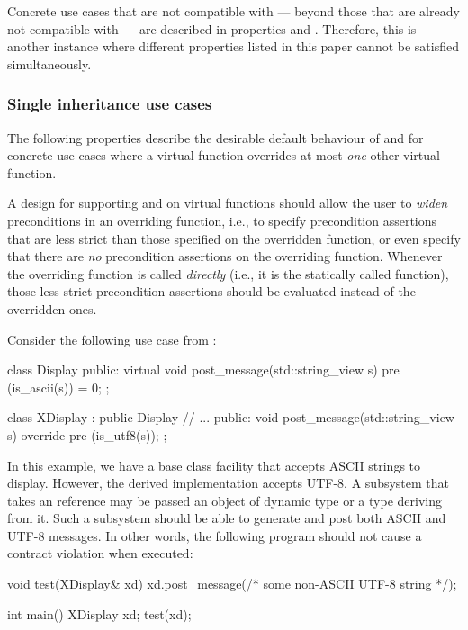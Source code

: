 Concrete use cases that are not compatible with  --- beyond those that are already not compatible with  --- are described in properties  and . Therefore, this is another instance where different properties listed in this paper cannot be satisfied simultaneously.

\subsubsection{Single inheritance use cases}

The following properties describe the desirable default behaviour of  and  for concrete use cases where a virtual function overrides at most \emph{one} other virtual function.


A design for supporting  and  on virtual functions should allow the user to \emph{widen} preconditions in an overriding function, i.e., to specify precondition assertions that are less strict than those specified on the overridden function, or even specify that there are \emph{no} precondition assertions on the overriding function. Whenever the overriding function is called \emph{directly} (i.e., it is the statically called function), those less strict precondition assertions should be evaluated instead of the overridden ones.

Consider the following use case from \cite{P0247R0}:
\begin{codeblock}
class Display {
public:
  virtual void post_message(std::string_view s)
     pre (is_ascii(s)) = 0;
};

class XDisplay : public Display {
   // ...
public:
  void post_message(std::string_view s) override
    pre (is_utf8(s));
 };
\end{codeblock}
In this example, we have a base class facility that accepts ASCII strings to display. However, the derived implementation accepts UTF-8. A subsystem that takes an  reference may be passed an object of dynamic type  or a type deriving from it. Such a subsystem should be able to generate and post both ASCII and UTF-8 messages. In other words, the following program should not cause a contract violation when executed:
\begin{codeblock}
void test(XDisplay& xd) {
  xd.post_message(/* some non-ASCII UTF-8 string */);
}

int main() {
  XDisplay xd;
  test(xd);
}
\end{codeblock}

